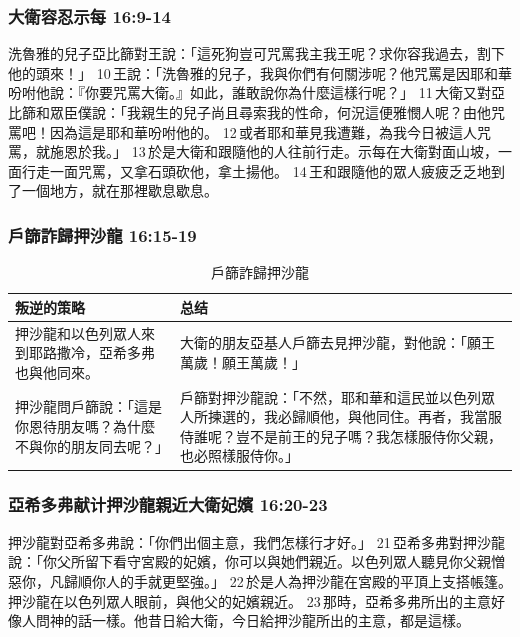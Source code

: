 \subsubsection{大衛容忍示每 16:9-14}
洗魯雅的兒子亞比篩對王說：「這死狗豈可咒罵我主我王呢？求你容我過去，割下他的頭來！」 10 王說：「洗魯雅的兒子，我與你們有何關涉呢？他咒罵是因耶和華吩咐他說：『你要咒罵大衛。』如此，誰敢說你為什麼這樣行呢？」 11 大衛又對亞比篩和眾臣僕說：「我親生的兒子尚且尋索我的性命，何況這便雅憫人呢？由他咒罵吧！因為這是耶和華吩咐他的。 12 或者耶和華見我遭難，為我今日被這人咒罵，就施恩於我。」 13 於是大衛和跟隨他的人往前行走。示每在大衛對面山坡，一面行走一面咒罵，又拿石頭砍他，拿土揚他。 14 王和跟隨他的眾人疲疲乏乏地到了一個地方，就在那裡歇息歇息。

\subsubsection{戶篩詐歸押沙龍 16:15-19}
\begin{table}[H]
\hspace*{-8mm}
\centering 
\begin{tabular}{p{8.5cm}|p{8.25cm}}\hline\hline
叛逆的策略&总结\\\hline
押沙龍和以色列眾人來到耶路撒冷，亞希多弗也與他同來。 &大衛的朋友亞基人戶篩去見押沙龍，對他說：「願王萬歲！願王萬歲！」\\\hline
押沙龍問戶篩說：「這是你恩待朋友嗎？為什麼不與你的朋友同去呢？」&戶篩對押沙龍說：「不然，耶和華和這民並以色列眾人所揀選的，我必歸順他，與他同住。再者，我當服侍誰呢？豈不是前王的兒子嗎？我怎樣服侍你父親，也必照樣服侍你。」\\\hline
\end{tabular}
\caption{戶篩詐歸押沙龍}
\end{table}


\subsubsection{亞希多弗献计押沙龍親近大衛妃嬪 16:20-23}
押沙龍對亞希多弗說：「你們出個主意，我們怎樣行才好。」 21 亞希多弗對押沙龍說：「你父所留下看守宮殿的妃嬪，你可以與她們親近。以色列眾人聽見你父親憎惡你，凡歸順你人的手就更堅強。」 22 於是人為押沙龍在宮殿的平頂上支搭帳篷。押沙龍在以色列眾人眼前，與他父的妃嬪親近。 23 那時，亞希多弗所出的主意好像人問神的話一樣。他昔日給大衛，今日給押沙龍所出的主意，都是這樣。

